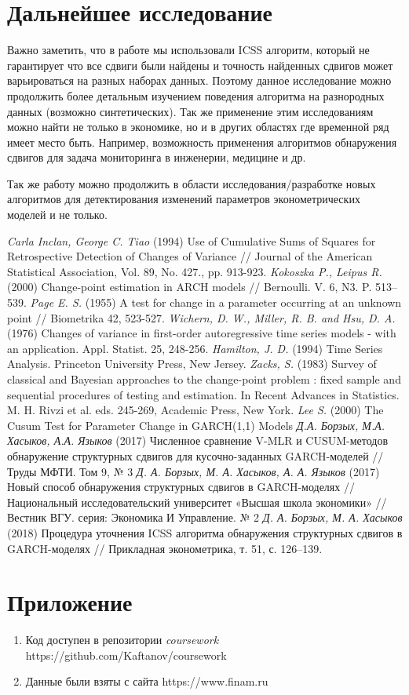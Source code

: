 \documentclass[a4paper,14pt,russian]{extarticle}
\begin{document}
	\section*{Дальнейшее исследование}
	Важно заметить, что в работе мы использовали ICSS алгоритм, который не гарантирует что все сдвиги были найдены и точность найденных сдвигов может варьироваться на разных наборах данных. Поэтому данное исследование можно продолжить более детальным изучением поведения алгоритма на разнородных данных (возможно синтетических). Так же применение этим исследованиям можно найти не только в экономике, но и в других областях где временной ряд имеет место быть. Например, возможность применения алгоритмов обнаружения сдвигов для задача мониторинга в инженерии, медицине и др.
	\par
	Так же работу можно продолжить в области исследования/разработке новых алгоритмов для детектирования изменений параметров эконометрических моделей и не только.
	\clearpage
	\begin{thebibliography}{20}
		\label{sec:sec5}
		 \emph{Carla Inclan, George C. Tiao} (1994) Use of Cumulative Sums of Squares for Retrospective Detection of Changes of Variance // Journal of the American Statistical Association, Vol. 89, No. 427., pp. 913-923.
		 \emph{Kokoszka P., Leipus R.} (2000) Change-point estimation in ARCH models  // Bernoulli. V. 6, N3. P. 513–539.
		 \emph{Page E. S.} (1955) A test for change in a parameter occurring at an unknown point // Biometrika 42, 523-527.
		 \emph{Wichern, D. W., Miller, R. B. and Hsu, D. A.} (1976) Changes of variance in first-order autoregressive time series models - with an application. Appl. Statist. 25, 248-256.
		 \emph{Hamilton, J. D.} (1994) Time Series Analysis. Princeton University Press, New Jersey. 
		\emph{Zacks, S.} (1983) Survey of classical and Bayesian approaches to the change-point problem : fixed sample and sequential procedures of testing and estimation. In Recent Advances in Statistics. M. H. Rivzi et al. eds. 245-269, Academic Press, New York.
		 \emph{Lee S. } (2000) The Cusum Test for Parameter Change in GARCH(1,1) Models
		 \emph{Д.А. Борзых, М.А. Хасыков, А.А. Языков} (2017) Численное сравнение V-MLR и CUSUM-методов обнаружение структурных сдвигов для кусочно-заданных GARCH-моделей // Труды МФТИ. Том 9, № 3
		 \emph{Д. А. Борзых, М. А. Хасыков, А. А. Языков} (2017) Новый способ обнаружения структурных сдвигов в GARCH-моделях // Национальный исследовательский университет «Высшая школа экономики» // Вестник ВГУ. серия: Экономика И Управление. № 2
		 \emph{Д. А. Борзых, М. А. Хасыков} (2018) Процедура уточнения ICSS алгоритма обнаружения структурных сдвигов в GARCH-моделях // Прикладная эконометрика, т. 51, с. 126–139.
	\end{thebibliography}
	
	\clearpage
	\section*{Приложение}
	\begin{enumerate}
		\item Код доступен в репозитории \emph{coursework} https://github.com/Kaftanov/coursework \label{git}
		\item Данные были взяты с сайта https://www.finam.ru \label{datasource}
	\end{enumerate}
\end{document}
